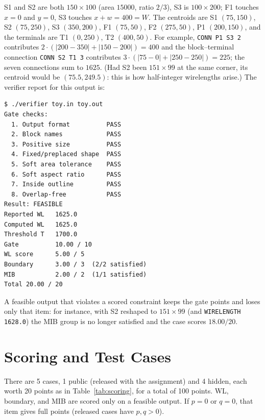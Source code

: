 \documentclass[11pt,a4paper]{article}
\newcommand{\kw}[1]{\texttt{#1}}
\begin{document}
S1 and S2 are both $150\times100$ (area $15000$, ratio $2/3$), S3 is
$100\times200$; F1 touches $x=0$ and $y=0$, S3 touches $x+w=400=W$. The
centroids are S1 $(75,150)$, S2 $(75,250)$, S3 $(350,200)$, F1 $(75,50)$,
F2 $(275,50)$, P1 $(200,150)$, and the terminals are T1 $(0,250)$,
T2 $(400,50)$. For example, \kw{CONN P1 S3 2} contributes
$2\cdot(|200-350|+|150-200|)=400$ and the block--terminal connection
\kw{CONN S2 T1 3} contributes $3\cdot(|75-0|+|250-250|)=225$; the seven
connections sum to $1625$. (Had S2 been $151\times99$ at the same corner, its
centroid would be $(75.5,249.5)$: this is how half-integer wirelengths arise.)
The verifier report for this output is:
\begin{Verbatim}[frame=single,fontsize=\footnotesize]
$ ./verifier toy.in toy.out
Gate checks:
  1. Output format          PASS
  2. Block names            PASS
  3. Positive size          PASS
  4. Fixed/preplaced shape  PASS
  5. Soft area tolerance    PASS
  6. Soft aspect ratio      PASS
  7. Inside outline         PASS
  8. Overlap-free           PASS
Result: FEASIBLE
Reported WL   1625.0
Computed WL   1625.0
Threshold T   1700.0
Gate          10.00 / 10
WL score      5.00 / 5
Boundary      3.00 / 3  (2/2 satisfied)
MIB           2.00 / 2  (1/1 satisfied)
Total 20.00 / 20
\end{Verbatim}
A feasible output that violates a scored constraint keeps the gate points and
loses only that item: for instance, with S2 reshaped to $151\times99$ (and
\kw{WIRELENGTH 1628.0}) the MIB group is no longer satisfied and the case
scores $18.00/20$.

\section{Scoring and Test Cases}
\label{sec:scoring}

There are 5 cases, 1 public (released with the assignment) and 4 hidden, each
worth 20 points as in Table~\ref{tab:scoring}, for a total of 100 points. WL,
boundary, and MIB are scored only on a feasible output. If $p=0$ or $q=0$,
that item gives full points (released cases have $p,q>0$).
\end{document}
